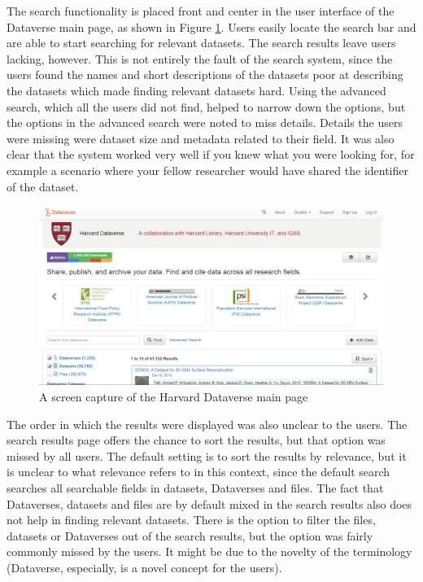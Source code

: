 The search functionality is placed front and center in the user interface of
the Dataverse main page, as shown in Figure \ref{fig:search_main_page}. Users
easily locate the search bar and are able to start searching for relevant
datasets. The search results leave users lacking, however. This is not entirely
the fault of the search system, since the users found the names and short
descriptions of the datasets poor at describing the datasets which made
finding relevant datasets hard. Using the advanced search, which all the users
did not find, helped to narrow down the options, but the options in the
advanced search were noted to miss details. Details the users were missing
were dataset size and metadata related to their field. It was also clear that
the system worked very well if you knew what you were looking for, for example
a scenario where your fellow researcher would have shared the identifier of
the dataset.

\begin{figure}
    \begin{centering}
        \includegraphics[width=\textwidth]{images/search_main_page}
    \end{centering}
    \caption{A screen capture of the Harvard Dataverse main page}
    \label{fig:search_main_page}
\end{figure}

The order in which the results were displayed was also unclear to the users.
The search results page offers the chance to sort the results, but that option
was missed by all users. The default setting is to sort the results by
relevance, but it is unclear to what relevance refers to in this context, since
the default search searches all searchable fields in datasets, Dataverses and files.
The fact that Dataverses, datasets and files are by default mixed in the search
results also does not help in finding relevant datasets. There is the option to
filter the files, datasets or Dataverses out of the search results, but the
option was fairly commonly missed by the users. It might be due to the novelty
of the terminology (Dataverse, especially, is a novel concept for the users).

